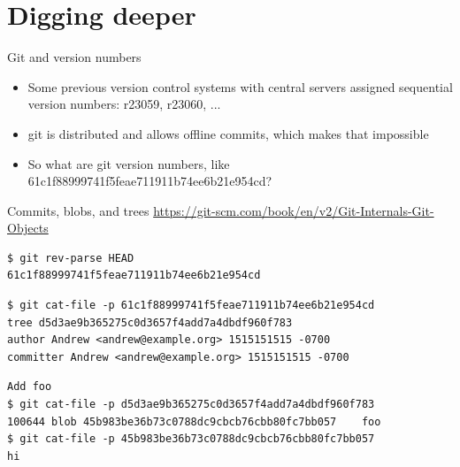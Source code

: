 \documentclass[xcolor=svgnames,17pt]{beamer}
\newcommand*{\sizefont}[1]{%
    \ifcase#1\relax
    \or \tiny
    \or \scriptsize
    \or \footnotesize
    \or \small
    \or \normalsize
    \or \large
    \or \Large
    \or \LARGE
    \or \huge
    \or \Huge
    \fi}
\begin{document}
\section{Digging deeper}

\begin{frame}
\tableofcontents[currentsection]
\end{frame}

\begin{frame}{Git and version numbers}
\begin{itemize}
\item Some previous version control systems with central servers assigned
sequential version numbers: r23059, r23060, ...
\pause
\item git is distributed and allows offline commits, which makes that
impossible
\pause
\item So what are git version numbers, like
61c1f88999741f5feae711911b74ee6b21e954cd?
\end{itemize}
\end{frame}

\begin{frame}[fragile]{Commits, blobs, and trees}
\sizefont{2}
\href{https://git-scm.com/book/en/v2/Git-Internals-Git-Objects}{https://git-scm.com/book/en/v2/Git-Internals-Git-Objects}

\begin{verbatim}
$ git rev-parse HEAD
61c1f88999741f5feae711911b74ee6b21e954cd
\end{verbatim}
\pause
\begin{verbatim}
$ git cat-file -p 61c1f88999741f5feae711911b74ee6b21e954cd
tree d5d3ae9b365275c0d3657f4add7a4dbdf960f783
author Andrew <andrew@example.org> 1515151515 -0700
committer Andrew <andrew@example.org> 1515151515 -0700
\end{verbatim}
\pause
\begin{verbatim}
Add foo
$ git cat-file -p d5d3ae9b365275c0d3657f4add7a4dbdf960f783
100644 blob 45b983be36b73c0788dc9cbcb76cbb80fc7bb057	foo
$ git cat-file -p 45b983be36b73c0788dc9cbcb76cbb80fc7bb057
hi
\end{verbatim}
\end{frame}
\end{document}
